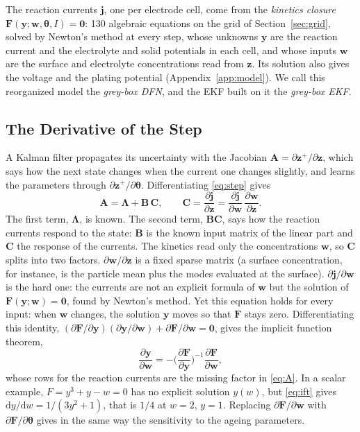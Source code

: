 \documentclass[journal]{IEEEtran}
\newcommand{\vz}{\bm{z}}\newcommand{\vj}{\bm{j}}\newcommand{\vy}{\bm{y}}\newcommand{\vw}{\bm{w}}
\newcommand{\vth}{\bm{\theta}}\newcommand{\vF}{\bm{F}}\newcommand{\mA}{\bm{A}}\newcommand{\mB}{\bm{B}}
\newcommand{\mC}{\bm{C}}\newcommand{\mP}{\bm{P}}\newcommand{\mLam}{\bm{\Lambda}}\newcommand{\dd}{\mathrm{d}}
\begin{document}
The reaction currents $\vj$, one per electrode cell, come from the \emph{kinetics closure} $\vF(\vy;\vw,\vth,I)=\bm 0$: 130 algebraic equations on the grid of Section~\ref{sec:grid}, solved by Newton's method at every step, whose unknowns $\vy$ are the reaction current and the electrolyte and solid potentials in each cell, and whose inputs $\vw$ are the surface and electrolyte concentrations read from $\vz$. Its solution also gives the voltage and the plating potential (Appendix~\ref{app:model}). We call this reorganized model the \emph{grey-box DFN}, and the EKF built on it the \emph{grey-box EKF}.

\subsection{The Derivative of the Step}\label{sec:ift}
A Kalman filter propagates its uncertainty with the Jacobian $\mA=\partial\vz^{+}/\partial\vz$, which says how the next state changes when the current one changes slightly, and learns the parameters through $\partial\vz^{+}/\partial\vth$. Differentiating \eqref{eq:step} gives
\begin{equation}
\mA=\mLam+\mB\,\mC,\qquad \mC=\frac{\partial\vj}{\partial\vz}=\frac{\partial\vj}{\partial\vw}\,\frac{\partial\vw}{\partial\vz}.
\label{eq:A}
\end{equation}
The first term, $\mLam$, is known. The second term, $\mB\mC$, says how the reaction currents respond to the state: $\mB$ is the known input matrix of the linear part and $\mC$ the response of the currents. The kinetics read only the concentrations $\vw$, so $\mC$ splits into two factors. $\partial\vw/\partial\vz$ is a fixed sparse matrix (a surface concentration, for instance, is the particle mean plus the modes evaluated at the surface). $\partial\vj/\partial\vw$ is the hard one: the currents are not an explicit formula of $\vw$ but the solution of $\vF(\vy;\vw)=\bm 0$, found by Newton's method. Yet this equation holds for every input: when $\vw$ changes, the solution $\vy$ moves so that $\vF$ stays zero. Differentiating this identity, $(\partial\vF/\partial\vy)(\partial\vy/\partial\vw)+\partial\vF/\partial\vw=\bm 0$, gives the implicit function theorem,
\begin{equation}
\frac{\partial\vy}{\partial\vw}=-\Big(\frac{\partial\vF}{\partial\vy}\Big)^{-1}\frac{\partial\vF}{\partial\vw},
\label{eq:ift}
\end{equation}
whose rows for the reaction currents are the missing factor in \eqref{eq:A}. In a scalar example, $F=y^3+y-w=0$ has no explicit solution $y(w)$, but \eqref{eq:ift} gives $\dd y/\dd w=1/(3y^2+1)$, that is $1/4$ at $w=2$, $y=1$. Replacing $\partial\vF/\partial\vw$ with $\partial\vF/\partial\vth$ gives in the same way the sensitivity to the ageing parameters.
\end{document}
